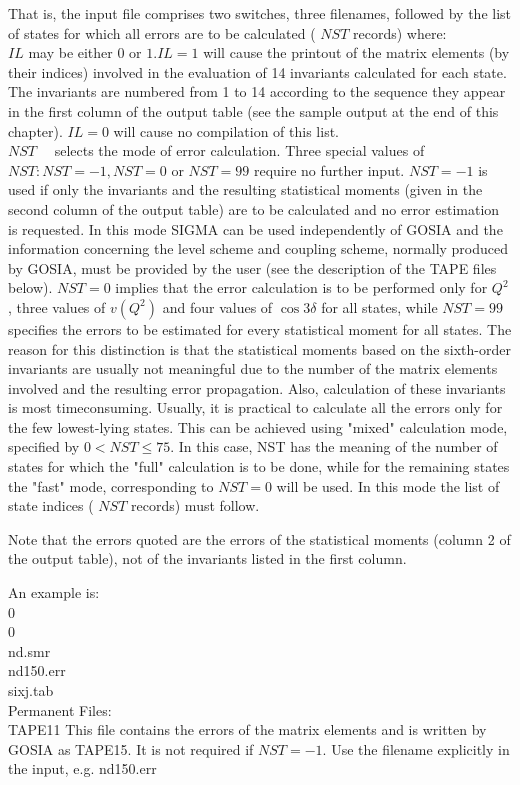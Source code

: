 \documentclass[10pt]{article}
\begin{document}
That is, the input file comprises two switches, three filenames, followed by the list of states for which all errors are to be calculated ( $N S T$ records) where:\\
$I L$ may be either 0 or $1 . I L=1$ will cause the printout of the matrix elements (by their indices) involved in the evaluation of 14 invariants calculated for each state. The invariants are numbered from 1 to 14 according to the sequence they appear in the first column of the output table (see the sample output at the end of this chapter). $I L=0$ will cause no compilation of this list.\\
$N S T \quad$ selects the mode of error calculation. Three special values of $N S T: N S T=-1, N S T=0$ or $N S T=99$ require no further input. $N S T=-1$ is used if only the invariants and the resulting statistical moments (given in the second column of the output table) are to be calculated and no error estimation is requested. In this mode SIGMA can be used independently of GOSIA and the information concerning the level scheme and coupling scheme, normally produced by GOSIA, must be provided by the user (see the description of the TAPE files below). $N S T=0$ implies that the error calculation is to be performed only for $Q^{2}$, three values of $v\left(Q^{2}\right)$ and four values of $\cos 3 \delta$ for all states, while $N S T=99$ specifies the errors to be estimated for every statistical moment for all states. The reason for this distinction is that the statistical moments based on the sixth-order invariants are usually not meaningful due to the number of the matrix elements involved and the resulting error propagation. Also, calculation of these invariants is most timeconsuming. Usually, it is practical to calculate all the errors only for the few lowest-lying states. This can be achieved using "mixed" calculation mode, specified by $0<N S T \leq 75$. In this case, NST has the meaning of the number of states for which the "full" calculation is to be done, while for the remaining states the "fast" mode, corresponding to $N S T=0$ will be used. In this mode the list of state indices ( $N S T$ records) must follow.

Note that the errors quoted are the errors of the statistical moments (column 2 of the output table), not of the invariants listed in the first column.

An example is:\\
0\\
0\\
nd.smr\\
nd150.err\\
sixj.tab\\
Permanent Files:\\
TAPE11 This file contains the errors of the matrix elements and is written by GOSIA as TAPE15. It is not required if $N S T=-1$. Use the filename explicitly in the input, e.g. nd150.err
\end{document}
